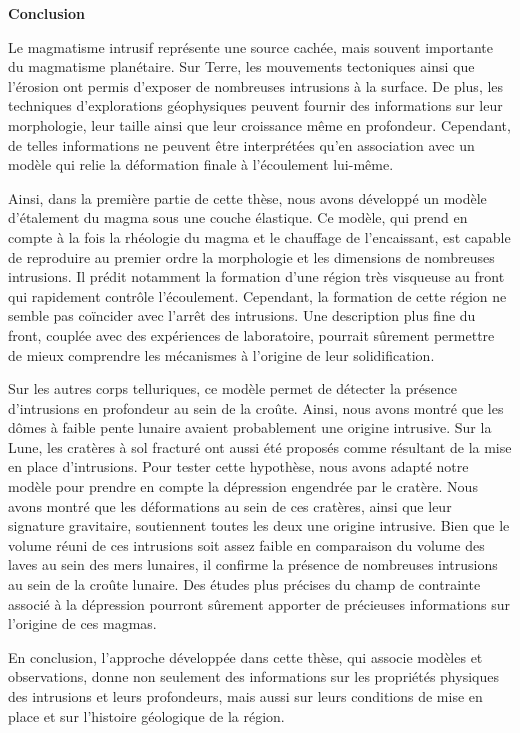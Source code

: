 \thispagestyle{plain}
\begin{center}
 \Large \vspace{.5cm} \textbf{Conclusion}
\end{center}

Le  magmatisme intrusif  représente  une source  cachée, mais  souvent
importante  du  magmatisme  planétaire.   Sur  Terre,  les  mouvements
tectoniques  ainsi que  l’érosion ont  permis d’exposer  de nombreuses
intrusions  à  la  surface.  De plus,  les  techniques  d'explorations
géophysiques peuvent  fournir des  informations sur  leur morphologie,
leur taille ainsi que leur  croissance même en profondeur.  Cependant,
de telles informations ne  peuvent être interprétées qu’en association
avec  un  modèle  qui  relie  la  déformation  finale  à  l’écoulement
lui-même.

Ainsi, dans la première partie de cette thèse, nous avons développé un
modèle d’étalement du magma sous  une couche élastique. Ce modèle, qui
prend en  compte à la  fois la rhéologie du  magma et le  chauffage de
l’encaissant,  est   capable  de   reproduire  au  premier   ordre  la
morphologie  et les  dimensions de  nombreuses intrusions.   Il prédit
notamment  la  formation d’une  région  très  visqueuse au  front  qui
rapidement contrôle  l’écoulement.  Cependant,  la formation  de cette
région  ne semble  pas  coïncider avec  l’arrêt  des intrusions.   Une
description  plus  fine du  front,  couplée  avec des  expériences  de
laboratoire,  pourrait  sûrement  permettre de  mieux  comprendre  les
mécanismes à l’origine de leur solidification.

Sur  les autres  corps telluriques,  ce modèle  permet de  détecter la
présence d’intrusions en profondeur au  sein de la croûte. Ainsi, nous
avons montré que les dômes à faible pente lunaire avaient probablement
une origine intrusive.   Sur la Lune, les cratères à  sol fracturé ont
aussi été proposés  comme résultant de la mise  en place d’intrusions.
Pour  tester cette  hypothèse,  nous avons  adapté  notre modèle  pour
prendre en compte la dépression  engendrée par le cratère.  Nous avons
montré que  les déformations au sein  de ces cratères, ainsi  que leur
signature  gravitaire,   soutiennent  toutes  les  deux   une  origine
intrusive.   Bien que  le volume  réuni de  ces intrusions  soit assez
faible en comparaison  du volume des laves au sein  des mers lunaires,
il confirme la présence de nombreuses  intrusions au sein de la croûte
lunaire. Des études plus précises du  champ de contrainte associé à la
dépression pourront  sûrement apporter de précieuses  informations sur
l’origine de ces magmas.

En  conclusion, l’approche  développée dans  cette thèse,  qui associe
modèles et observations, donne non  seulement des informations sur les
propriétés physiques  des intrusions et leurs  profondeurs, mais aussi
sur leurs conditions de mise en  place et sur l’histoire géologique de
la région.





